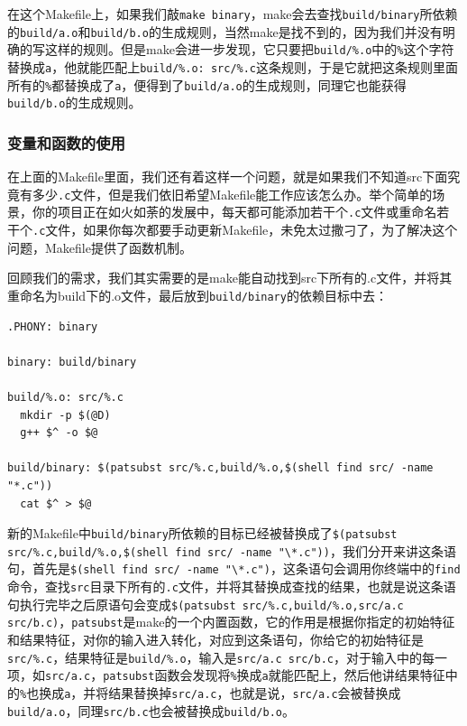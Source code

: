 \documentclass[lang=cn,11pt,a4paper]{elegantpaper}
\begin{document}
在这个Makefile上，如果我们敲\lstinline!make binary!，make会去查找\lstinline!build/binary!所依赖的\lstinline!build/a.o!和\lstinline!build/b.o!的生成规则，当然make是找不到的，因为我们并没有明确的写这样的规则。但是make会进一步发现，它只要把\lstinline!build/%.o!中的\lstinline!%!这个字符替换成\lstinline!a!，他就能匹配上\lstinline!build/%.o: src/%.c!这条规则，于是它就把这条规则里面所有的\lstinline!%!都替换成了\lstinline!a!，便得到了\lstinline!build/a.o!的生成规则，同理它也能获得\lstinline!build/b.o!的生成规则。

\subsubsection{变量和函数的使用}

在上面的Makefile里面，我们还有着这样一个问题，就是如果我们不知道src下面究竟有多少\lstinline!.c!文件，但是我们依旧希望Makefile能工作应该怎么办。举个简单的场景，你的项目正在如火如荼的发展中，每天都可能添加若干个\lstinline!.c!文件或重命名若干个\lstinline!.c!文件，如果你每次都要手动更新Makefile，未免太过撒刁了，为了解决这个问题，Makefile提供了函数机制。

回顾我们的需求，我们其实需要的是make能自动找到src下所有的.c文件，并将其重命名为build下的.o文件，最后放到\lstinline!build/binary!的依赖目标中去：

\begin{lstlisting}
.PHONY: binary

binary: build/binary

build/%.o: src/%.c
  mkdir -p $(@D)
  g++ $^ -o $@

build/binary: $(patsubst src/%.c,build/%.o,$(shell find src/ -name "*.c"))
  cat $^ > $@
\end{lstlisting}

新的Makefile中\lstinline!build/binary!所依赖的目标已经被替换成了\lstinline!$(patsubst src/%.c,build/%.o,$(shell find src/ -name "\*.c"))!，我们分开来讲这条语句，首先是\lstinline!$(shell find src/ -name "\*.c")!，这条语句会调用你终端中的\lstinline!find!命令，查找\lstinline!src!目录下所有的\lstinline!.c!文件，并将其替换成查找的结果，也就是说这条语句执行完毕之后原语句会变成\lstinline!$(patsubst src/%.c,build/%.o,src/a.c src/b.c)!，\lstinline!patsubst!是make的一个内置函数，它的作用是根据你指定的初始特征和结果特征，对你的输入进入转化，对应到这条语句，你给它的初始特征是\lstinline!src/%.c!，结果特征是\lstinline!build/%.o!，输入是\lstinline!src/a.c src/b.c!，对于输入中的每一项，如\lstinline!src/a.c!，\lstinline!patsubst!函数会发现将\lstinline!%!换成\lstinline!a!就能匹配上，然后他讲结果特征中的\lstinline!%!也换成\lstinline!a!，并将结果替换掉\lstinline!src/a.c!，也就是说，\lstinline!src/a.c!会被替换成\lstinline!build/a.o!，同理\lstinline!src/b.c!也会被替换成\lstinline!build/b.o!。
\end{document}
